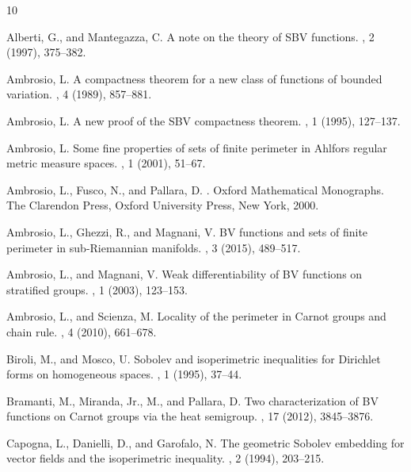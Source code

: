 \documentclass[12pt,a4paper]{amsart}
\theoremstyle{definition}
\theoremstyle{plain}
\begin{document}
\begin{thebibliography}{10}

{\sc Alberti, G., and Mantegazza, C.}
\newblock A note on the theory of {SBV} functions.
, 2 (1997), 375--382.

{\sc Ambrosio, L.}
\newblock A compactness theorem for a new class of functions of bounded variation.
, 4 (1989), 857--881.

{\sc Ambrosio, L.}
\newblock A new proof of the {SBV} compactness theorem.
, 1 (1995), 127--137.

{\sc Ambrosio, L.}
\newblock Some fine properties of sets of finite perimeter in {A}hlfors regular metric measure spaces.
, 1 (2001), 51--67.

{\sc Ambrosio, L., Fusco, N., and Pallara, D.}
.
\newblock Oxford Mathematical Monographs. The Clarendon Press, Oxford University Press, New York, 2000.

{\sc Ambrosio, L., Ghezzi, R., and Magnani, V.}
\newblock B{V} functions and sets of finite perimeter in sub-{R}iemannian manifolds.
, 3 (2015), 489--517.

{\sc Ambrosio, L., and Magnani, V.}
\newblock Weak differentiability of {BV} functions on stratified groups.
, 1 (2003), 123--153.

{\sc Ambrosio, L., and Scienza, M.}
\newblock Locality of the perimeter in {C}arnot groups and chain rule.
, 4 (2010), 661--678.

{\sc Biroli, M., and Mosco, U.}
\newblock Sobolev and isoperimetric inequalities for {D}irichlet forms on homogeneous spaces.
, 1 (1995), 37--44.

{\sc Bramanti, M., Miranda, Jr., M., and Pallara, D.}
\newblock Two characterization of {BV} functions on {C}arnot groups via the heat semigroup.
, 17 (2012), 3845--3876.

{\sc Capogna, L., Danielli, D., and Garofalo, N.}
\newblock The geometric {S}obolev embedding for vector fields and the isoperimetric inequality.
, 2 (1994), 203--215.


\end{thebibliography}
\end{document}
